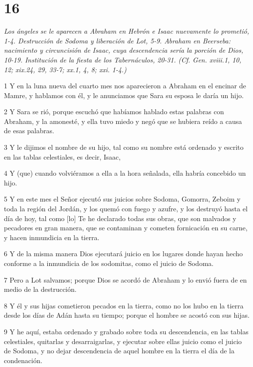 \chapter{16}

\par \textit{Los ángeles se le aparecen a Abraham en Hebrón e Isaac nuevamente lo prometió, 1-4. Destrucción de Sodoma y liberación de Lot, 5-9. Abraham en Beerseba: nacimiento y circuncisión de Isaac, cuya descendencia sería la porción de Dios, 10-19. Institución de la fiesta de los Tabernáculos, 20-31. (Cf. Gen. xviii.1, 10, 12; xix.24, 29, 33-7; xx.1, 4, 8; xxi. 1-4.)}

\par 1 Y en la luna nueva del cuarto mes nos aparecieron a Abraham en el encinar de Mamre, y hablamos con él, y le anunciamos que Sara su esposa le daría un hijo.
\par 2 Y Sara se rió, porque escuchó que habíamos hablado estas palabras con Abraham, y la amonesté, y ella tuvo miedo y negó que se hubiera reído a causa de esas palabras.
\par 3 Y le dijimos el nombre de su hijo, tal como su nombre está ordenado y escrito en las tablas celestiales, es decir, Isaac,
\par 4 Y (que) cuando volviéramos a ella a la hora señalada, ella habría concebido un hijo.
\par 5 Y en este mes el Señor ejecutó sus juicios sobre Sodoma, Gomorra, Zeboim y toda la región del Jordán, y los quemó con fuego y azufre, y los destruyó hasta el día de hoy, tal como [lo] Te he declarado todas sus obras, que son malvados y pecadores en gran manera, que se contaminan y cometen fornicación en su carne, y hacen inmundicia en la tierra.
\par 6 Y de la misma manera Dios ejecutará juicio en los lugares donde hayan hecho conforme a la inmundicia de los sodomitas, como el juicio de Sodoma.
\par 7 Pero a Lot salvamos; porque Dios se acordó de Abraham y lo envió fuera de en medio de la destrucción.
\par 8 Y él y sus hijas cometieron pecados en la tierra, como no los hubo en la tierra desde los días de Adán hasta su tiempo; porque el hombre se acostó con sus hijas.
\par 9 Y he aquí, estaba ordenado y grabado sobre toda su descendencia, en las tablas celestiales, quitarlas y desarraigarlas, y ejecutar sobre ellas juicio como el juicio de Sodoma, y ​​no dejar descendencia de aquel hombre en la tierra el día de la condenación.
